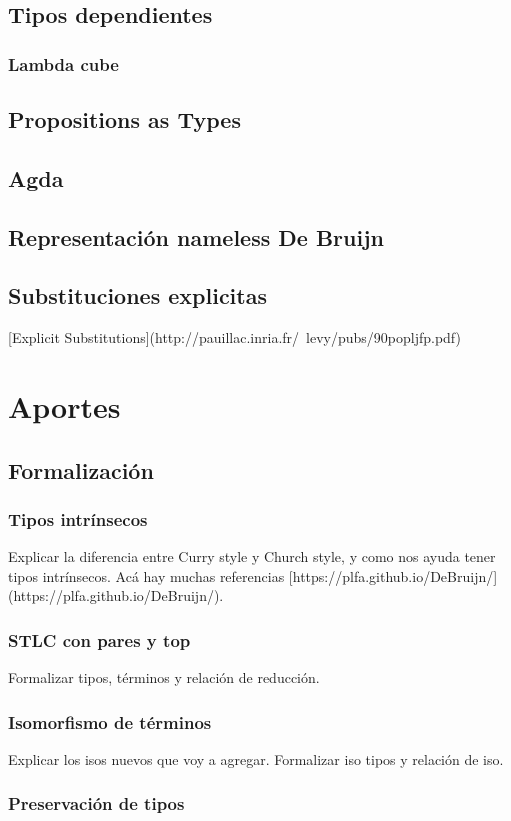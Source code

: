 \documentclass[]{report}
\begin{document}
\section{Tipos dependientes}
\subsection{Lambda cube}
\section{Propositions as Types}
\section{Agda}
\section{Representación nameless De Bruijn}
\section{Substituciones explicitas}
[Explicit Substitutions](http://pauillac.inria.fr/~levy/pubs/90popljfp.pdf)


\chapter{Aportes}
\section{Formalización}
\subsection{Tipos intrínsecos}
Explicar la diferencia entre Curry style y Church style, y como nos ayuda tener tipos intrínsecos. Acá hay muchas referencias [https://plfa.github.io/DeBruijn/] (https://plfa.github.io/DeBruijn/).
\subsection{STLC con pares y top}
Formalizar tipos, términos y relación de reducción.
\subsection{Isomorfismo de términos}
Explicar los isos nuevos que voy a agregar. Formalizar iso tipos y relación de iso.

\subsection{Preservación de tipos}
\end{document}
